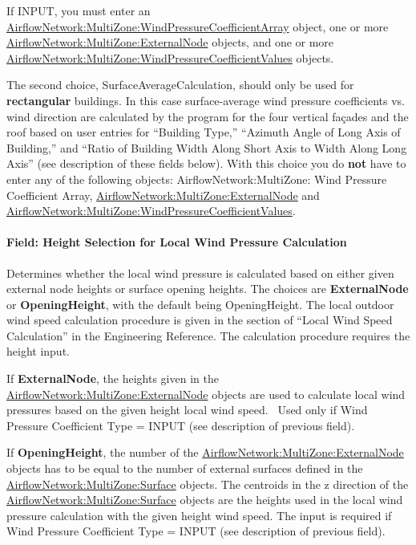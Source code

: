 If INPUT, you must enter an \hyperref[airflownetworkmultizonewindpressurecoefficientarray]{AirflowNetwork:MultiZone:WindPressureCoefficientArray} object, one or more \hyperref[airflownetworkmultizoneexternalnode]{AirflowNetwork:MultiZone:ExternalNode} objects, and one or more \hyperref[airflownetworkmultizonewindpressurecoefficientvalues]{AirflowNetwork:MultiZone:WindPressureCoefficientValues} objects.

The second choice, SurfaceAverageCalculation, should only be used for \textbf{rectangular} buildings. In this case surface-average wind pressure coefficients vs. wind direction are calculated by the program for the four vertical fa\c{c}ades and the roof based on user entries for ``Building Type,'' ``Azimuth Angle of Long Axis of Building,'' and ``Ratio of Building Width Along Short Axis to Width Along Long Axis'' (see description of these fields below). With this choice you do \textbf{not} have to enter any of the following objects: AirflowNetwork:MultiZone: Wind Pressure Coefficient Array, \hyperref[airflownetworkmultizoneexternalnode]{AirflowNetwork:MultiZone:ExternalNode} and \hyperref[airflownetworkmultizonewindpressurecoefficientvalues]{AirflowNetwork:MultiZone:WindPressureCoefficientValues}.

\paragraph{Field: Height Selection for Local Wind Pressure Calculation}\label{field-height-selection-for-local-wind-pressure-calculation}

Determines whether the local wind pressure is calculated based on either given external node heights or surface opening heights. The choices are \textbf{ExternalNode} or \textbf{OpeningHeight}, with the default being OpeningHeight. The local outdoor wind speed calculation procedure is given in the section of ``Local Wind Speed Calculation'' in the Engineering Reference. The calculation procedure requires the height input.

If \textbf{ExternalNode}, the heights given in the \hyperref[airflownetworkmultizoneexternalnode]{AirflowNetwork:MultiZone:ExternalNode} objects are used to calculate local wind pressures based on the given height local wind speed.~ Used only if Wind Pressure Coefficient Type = INPUT (see description of previous field).

If \textbf{OpeningHeight}, the number of the \hyperref[airflownetworkmultizoneexternalnode]{AirflowNetwork:MultiZone:ExternalNode} objects has to be equal to the number of external surfaces defined in the \hyperref[airflownetworkmultizonesurface]{AirflowNetwork:MultiZone:Surface} objects. The centroids in the z direction of the \hyperref[airflownetworkmultizonesurface]{AirflowNetwork:MultiZone:Surface} objects are the heights used in the local wind pressure calculation with the given height wind speed. The input is required if Wind Pressure Coefficient Type = INPUT (see description of previous field).

